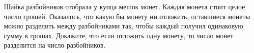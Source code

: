 Шайка разбойников отобрала у купца мешок монет. Каждая монета стоит целое число грошей. Оказалось, что какую бы монету ни отложить, оставшиеся монеты можно разделить между разбойниками так, чтобы каждый получил одинаковую сумму в грошах. Докажите, что если отложить одну монету, то число монет разделится на число разбойников.